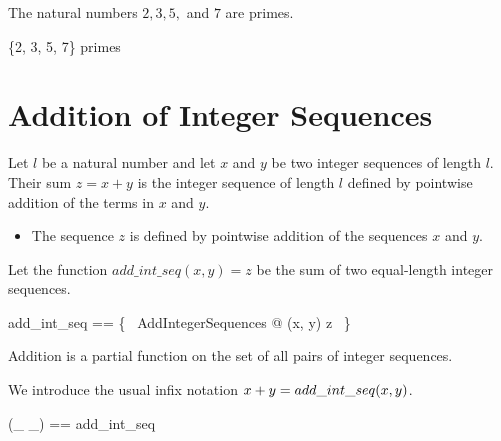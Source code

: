 \documentclass{amsart}
\begin{document}
\begin{example}
The natural numbers $2, 3, 5,$ and $7$ are primes.

\begin{zed}
	\{2, 3, 5, 7\} \subseteq primes
\end{zed}
\end{example}

\section{Addition of Integer Sequences}

Let $l$ be a natural number and
let $x$ and $y$ be two integer sequences of length $l$.
Their sum $z = x + y$ is the integer sequence of length $l$ defined by pointwise addition
of the terms in $x$ and $y$.

\begin{itemize}
	\item The sequence $z$ is defined by pointwise addition of the sequences $x$ and $y$.
\end{itemize}

Let the function $add\_int\_seq(x, y) = z$ be the sum of two equal-length integer sequences.

\begin{zed}
	add\_int\_seq == \{~ AddIntegerSequences @ (x, y) \mapsto z ~\}
\end{zed}

\begin{remark}
Addition is a partial function on the set of all pairs of integer sequences.
\end{remark}

We introduce the usual infix notation $x \mathbin{+} y = add\_int\_seq(x, y)$.

\begin{zed}
	(\_ \addSeqZ \_) == add\_int\_seq
\end{zed}

\printbibliography
\end{document}
